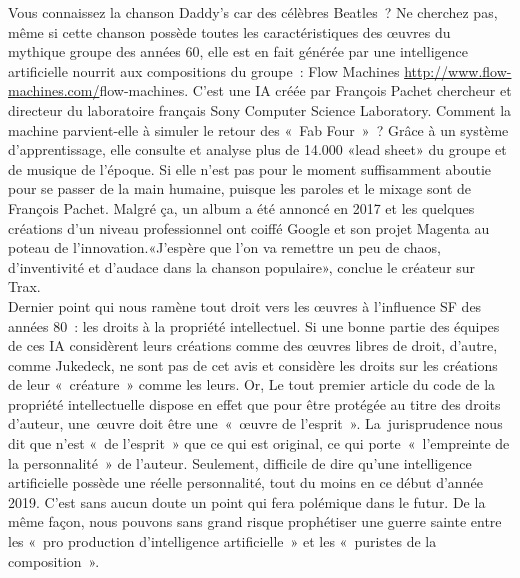 \documentclass[12pt, a4paper]{article}
\begin{document}
        Vous connaissez la chanson Daddy's car des célèbres Beatles ? Ne cherchez pas, même si cette chanson possède toutes les caractéristiques des œuvres du mythique groupe des années 60, elle est en fait générée par une intelligence artificielle nourrit aux compositions du groupe : Flow Machines \url{http://www.flow-machines.com/}{flow-machines}. C’est une IA créée par François Pachet chercheur et directeur du laboratoire français Sony Computer Science Laboratory. Comment la machine parvient-elle à simuler le retour des « Fab Four » ? Grâce à un système d’apprentissage, elle consulte et analyse plus de 14.000 «lead sheet» du groupe et de musique de l’époque. Si elle n’est pas pour le moment suffisamment aboutie pour se passer de la main humaine, puisque les paroles et le mixage sont de François Pachet. Malgré ça, un album a été annoncé en 2017 et les quelques créations d’un niveau professionnel ont coiffé Google et son projet Magenta au poteau de l’innovation.«J'espère que l'on va remettre un peu de chaos, d'inventivité et d'audace dans la chanson populaire», conclue le créateur sur Trax.\\
        
        Dernier point qui nous ramène tout droit vers les œuvres à l’influence SF des années 80 : les droits à la propriété intellectuel.  Si une bonne partie des équipes de ces IA considèrent leurs créations comme des œuvres libres de droit, d’autre, comme Jukedeck, ne sont pas de cet avis et considère les droits sur les créations de leur « créature » comme les leurs. Or, Le tout premier article du code de la propriété intellectuelle dispose en effet que pour être protégée au titre des droits d’auteur, une œuvre doit être une « œuvre de l’esprit ». La jurisprudence nous dit que n’est « de l’esprit » que ce qui est original, ce qui porte « l’empreinte de la personnalité » de l’auteur. Seulement, difficile de dire qu’une intelligence artificielle possède une réelle personnalité, tout du moins en ce début d’année 2019. C’est sans aucun doute un point qui fera polémique dans le futur. De la même façon, nous pouvons sans grand risque prophétiser une guerre sainte entre les « pro production d’intelligence artificielle » et les « puristes de la composition ».
    
    
\end{document}
